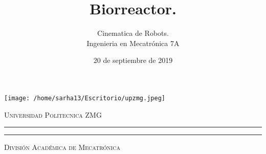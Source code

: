 \documentclass[letter,operight,12pt,spanish]{report}
\title{\textbf{Biorreactor.}}
\author{Cinematica de Robots.\\
		Ingenieria en Mecatr\'onica 7A}
\date{20 de septiembre de 2019}
\begin{document}
\thispagestyle{empty} %
%
%
%
%
%
%
%
%
%
%
%
%
%
%
%
%
\begin{minipage}[c][0.15\textheight][c]{0.14\textwidth}
    \begin{center}
\texttt{[image: /home/sarha13/Escritorio/upzmg.jpeg]} %
    \end{center}
\end{minipage}
%
%
%
%
%
%
%
%
%
%
%
%
%
%
%
\begin{minipage}[c][0.17\textheight][t]{0.7\textwidth}
    \begin{center}
        {\scshape \Huge Universidad Politecnica ZMG} %
        \vspace{.5cm}   %
        \hrule height2.5pt  %
        \vspace{.1cm}    %
        \hrule height1pt  %
        \vspace{.4cm}   %
        {\scshape \LARGE Divisi\'on Acad\'emica de Mecatr\'onica}  %
    \end{center}
\end{minipage}
%
%
%
%
%
%
%
%
%
%
%
%
%
%
%
%
%
%
%
%
%
%
%
%
%
%
%
%
%
%
%
\end{document}
